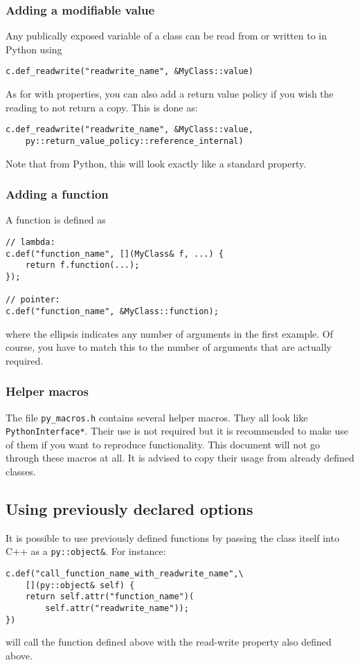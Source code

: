 \subsubsection{Adding a modifiable value}
Any publically exposed variable of a class can be read from or written to in Python using

\begin{verbatim}
c.def_readwrite("readwrite_name", &MyClass::value)
\end{verbatim}
As for with properties, you can also add a return value policy if you wish the reading
to not return a copy.  This is done as:
\begin{verbatim}
c.def_readwrite("readwrite_name", &MyClass::value,
    py::return_value_policy::reference_internal)
\end{verbatim}
Note that from Python, this will look exactly like a standard property.

\subsubsection{Adding a function}
A function is defined as
\begin{verbatim}
// lambda:
c.def("function_name", [](MyClass& f, ...) {
    return f.function(...); 
});

// pointer:
c.def("function_name", &MyClass::function);
\end{verbatim}
where the ellipsis indicates any number of arguments in the first example.  Of course,
you have to match this to the number of arguments that are actually required.

\subsubsection{Helper macros}
The file \verb|py_macros.h| contains several helper macros.  They all look like \texttt{PythonInterface*}.
Their use is not required but it is recommended to make use of them if you want to reproduce functionality.  This document will not go
through these macros at all.  It is advised to copy their usage from already defined classes.

\subsection{Using previously declared options}
It is possible to use previously defined functions by passing the class itself into C++ as a \texttt{py::object&}.
For instance:
\begin{verbatim}
c.def("call_function_name_with_readwrite_name",\
    [](py::object& self) {
    return self.attr("function_name")(
        self.attr("readwrite_name"));
})
\end{verbatim}
will call the function defined above with the read-write property also defined above.

